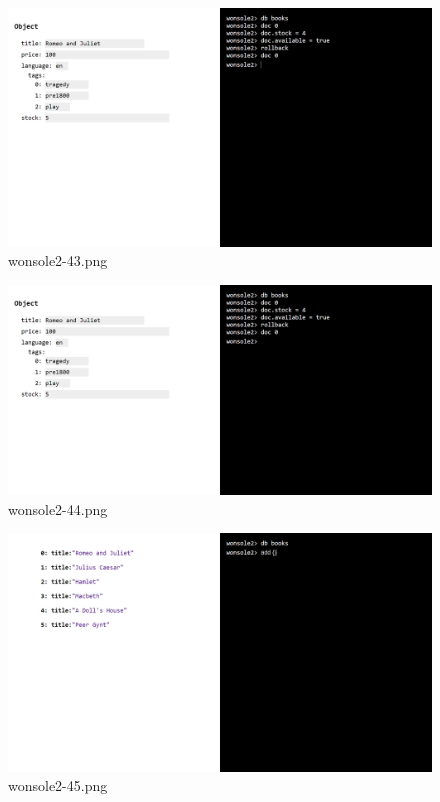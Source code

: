 \clearpage
\begin{figure}
\includegraphics[width=\textwidth]{screenshot/wonsole2/wonsole2-43.png}
\caption{wonsole2-43.png}
\label{wonsole2-43.png}
\end{figure}


\begin{figure}
\includegraphics[width=\textwidth]{screenshot/wonsole2/wonsole2-44.png}
\caption{wonsole2-44.png}
\label{wonsole2-44.png}
\end{figure}


\clearpage
\begin{figure}
\includegraphics[width=\textwidth]{screenshot/wonsole2/wonsole2-45.png}
\caption{wonsole2-45.png}
\label{wonsole2-45.png}
\end{figure}


